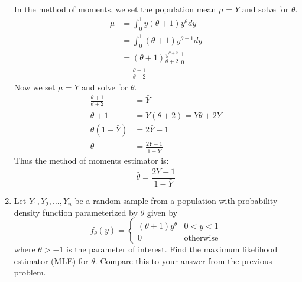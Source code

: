 \documentclass[12pt]{article}
\begin{document}
\begin{enumerate}
In the method of moments, we set the population mean $\mu = \bar{Y}$ and solve for $\theta$.
\begin{align*}
\mu &= \int_0^1 y (\theta + 1)y^\theta dy \\
&= \int_0^1 (\theta + 1)y^{\theta + 1}dy \\
&= (\theta + 1)\frac{y^{\theta + 2}}{\theta + 2}\Bigr|_0^1 \\
&= \frac{\theta + 1}{\theta + 2}
\end{align*}
Now we set $\mu = \bar{Y}$ and solve for $\theta$.
\begin{align*}
\frac{\theta + 1}{\theta + 2} &= \bar{Y} \\
\theta + 1 &= \bar{Y}( \theta + 2 ) = \bar{Y}\theta + 2 \bar{Y} \\
\theta(1 - \bar{Y}) &= 2 \bar{Y} - 1\\
\theta &= \frac{ 2 \bar{Y} - 1 }{ 1 - \bar{Y} }
\end{align*}
Thus the method of moments estimator is:
\[
\hat{\theta} = \frac{ 2 \bar{Y} - 1 }{ 1 - \bar{Y} }
\]
\item Let $Y_1, Y_2, \dots, Y_n$ be a random sample from a population with probability density function parameterized by $\theta$ given by
\[
f_\theta(y) = \begin{cases}
(\theta + 1)y^\theta & 0 < y < 1 \\
0 & \text{otherwise}
\end{cases}
\]
where $\theta > -1$ is the parameter of interest. Find the maximum likelihood estimator (MLE) for $\theta$. Compare this to your answer from the previous problem.\\


\end{enumerate}
\end{document}
